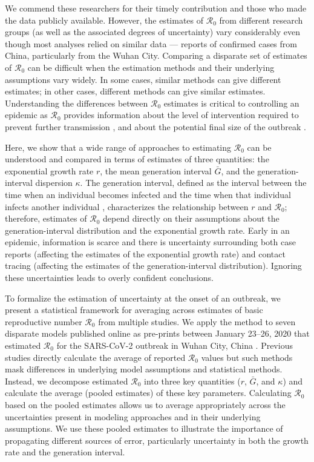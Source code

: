 \documentclass[12pt]{article}
\newcommand{\Ro}{\ensuremath{{\mathcal R}_{0}}\xspace}
\begin{document}
We commend these researchers for their timely contribution and those who made the data publicly available.
However, the estimates of \Ro from different research groups (as well as the associated degrees of uncertainty) vary considerably even though most analyses relied on similar data --- reports of confirmed cases from China, particularly from the Wuhan City.
Comparing a disparate set of estimates of \Ro can be difficult when the estimation methods and their underlying assumptions vary widely.
In some cases, similar methods can give different estimates; in other cases, different methods can give similar estimates.
Understanding the differences between \Ro estimates is critical to controlling an epidemic as \Ro provides information about the level of intervention required to prevent further transmission \citep{anderson1991infectious}, and about the potential final size of the outbreak \citep{anderson1991infectious, ma2006generality}.

Here, we show that a wide range of approaches to estimating \Ro can be understood and compared in terms of estimates of three quantities: the exponential growth rate $r$, the mean generation interval $\bar G$, and the generation-interval dispersion $\kappa$.
The generation interval, defined as the interval between the time when an individual becomes infected and the time when that individual infects another individual \citep{svensson2007note}, characterizes the relationship between $r$ and \Ro \citep{wearing2005appropriate, roberts2007model, wallinga2007generation, park2019practical};
therefore, estimates of \Ro depend directly on their assumptions about the generation-interval distribution and the exponential growth rate.
Early in an epidemic, information is scarce and there is uncertainty surrounding both case reports (affecting the estimates of the exponential growth rate) and contact tracing (affecting the estimates of the generation-interval distribution).
Ignoring these uncertainties leads to overly confident conclusions.

To formalize the estimation of uncertainty at the onset of an outbreak, we present a statistical framework for averaging across estimates of basic reproductive number \Ro from multiple studies. 
We apply the method to seven disparate models published online as pre-prints between January 23--26, 2020 that estimated \Ro for the SARS-CoV-2 outbreak in Wuhan City, China \citep{bedfordncov, imaincov, liuncov, majumderncov, readncov, riouncov, zhaoncov}.
Previous studies directly calculate the average of reported \Ro values \citep{majumder2020early, liu2020reproductive} but such methods mask differences in underlying model assumptions and statistical methods.
Instead, we decompose estimated \Ro into three key quantities ($r$, $\bar G$, and $\kappa$) and calculate the average (pooled estimates) of these key parameters.
Calculating \Ro based on the pooled estimates allows us to average appropriately across the uncertainties present in modeling approaches and in their underlying assumptions.
We use these pooled estimates to illustrate the importance of propagating different sources of error, particularly uncertainty in both the growth rate and the generation interval.
\end{document}
